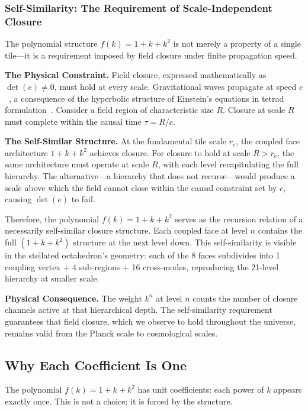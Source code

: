 \documentclass[aps,prd,preprint,superscriptaddress,showpacs,preprintnumbers,amsmath,amssymb,nofootinbib]{revtex4-2}
\begin{document}
\subsubsection*{Self-Similarity: The Requirement of Scale-Independent Closure}

The polynomial structure $f(k) = 1 + k + k^2$ is not merely a property of a single tile—it is a requirement imposed by field closure under finite propagation speed.

\textbf{The Physical Constraint.}
Field closure, expressed mathematically as $\det(e) \neq 0$, must hold at every scale. Gravitational waves propagate at speed $c$~\cite{abbott2016}, a consequence of the hyperbolic structure of Einstein's equations in tetrad formulation~\cite{buchman2003}. Consider a field region of characteristic size $R$. Closure at scale $R$ must complete within the causal time $\tau = R/c$.

\textbf{The Self-Similar Structure.}
At the fundamental tile scale $r_e$, the coupled face architecture $1 + k + k^2$ achieves closure. For closure to hold at scale $R > r_e$, the same architecture must operate at scale $R$, with each level recapitulating the full hierarchy. The alternative—a hierarchy that does not recurse—would produce a scale above which the field cannot close within the causal constraint set by $c$, causing $\det(e)$ to fail.

Therefore, the polynomial $f(k) = 1 + k + k^2$ serves as the recursion relation of a necessarily self-similar closure structure. Each coupled face at level $n$ contains the full $(1 + k + k^2)$ structure at the next level down. This self-similarity is visible in the stellated octahedron's geometry: each of the 8 faces subdivides into 1 coupling vertex + 4 sub-regions + 16 cross-modes, reproducing the 21-level hierarchy at smaller scale.

\textbf{Physical Consequence.}
The weight $k^n$ at level $n$ counts the number of closure channels active at that hierarchical depth. The self-similarity requirement guarantees that field closure, which we observe to hold throughout the universe, remains valid from the Planck scale to cosmological scales.

\subsection{Why Each Coefficient Is One}
\label{subsec:coefficients}

The polynomial $f(k) = 1 + k + k^2$ has unit coefficients: each power of $k$ appears exactly once. This is not a choice; it is forced by the structure.
\end{document}
